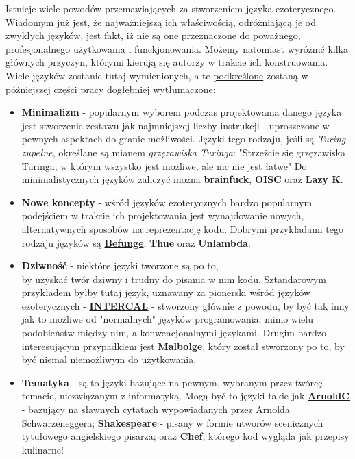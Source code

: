 \documentclass[fleqn,10pt]{SelfArx} %
\begin{document}
Istnieje wiele powodów przemawiających za stworzeniem języka ezoterycznego.
Wiadomym już jest, że najważniejszą ich właściwością, odróżniającą je od zwykłych języków,
jest fakt, iż nie są one przeznaczone do poważnego, profesjonalnego użytkowania i funckjonowania.
Możemy natomiast wyróżnić kilka głównych przyczyn, którymi kierują się autorzy w trakcie ich konstruowania.
Wiele języków zostanie tutaj wymienionych, a te \underline{podkreślone} zostaną w późniejszej części pracy dogłębniej wytłumaczone:
\begin{itemize}
	\item \textbf{Minimalizm} - popularnym wyborem podczas projektowania danego języka jest stworzenie zestawu jak najmniejszej liczby instrukcji - 
	uproszczone w pewnych aspektach do granic możliwości.
	Języki tego rodzaju, jeśli są \textit{Turing-zupełne}, określane są mianem \textit{grzęzawiska Turinga}:
	"Strzeżcie się grzęzawiska Turinga, w którym wszystko jest możliwe, ale nic nie jest łatwe"\cite{perlisAlan:epigrams}
	Do minimalistycznych języków zaliczyć można \underline{\textbf{brainfuck}}, \textbf{OISC} oraz \textbf{Lazy K}.
	\item \textbf{Nowe koncepty} - wśród języków ezoterycznych bardzo popularnym podejściem w trakcie ich projektowania jest 
	wynajdowanie nowych, alternatywnych sposobów na reprezentację kodu. Dobrymi przykładami tego rodzaju języków są \underline{\textbf{Befunge}}, \textbf{Thue} oraz \textbf{Unlambda}.
	\item \textbf{Dziwność} - niektóre języki tworzone są po to,\\by uzyskać twór dziwny i trudny do pisania w nim kodu.
	Sztandarowym przykładem byłby tutaj język, uznawany za pionerski wśród języków ezoterycznych - \hyperlink{oldestLang}{\underline{\textbf{INTERCAL}}} - stworzony głównie z powodu,
	by być tak inny jak to możliwe od "normalnych" języków programowania, mimo wielu podobieństw między nim, a konwencjonalnymi językami.
	Drugim bardzo interesującym przypadkiem jest \underline{\textbf{Malbolge}}, który został stworzony po to, by być niemal niemożliwym do użytkowania.
	\item \textbf{Tematyka} - są to języki bazujące na pewnym, wybranym przez twórcę temacie, niezwiązanym z informatyką.
	Mogą być to języki takie jak \underline{\textbf{ArnoldC}} - bazujący na sławnych cytatach wypowiadanych przez Arnolda Schwarzeneggera; \textbf{Shakespeare} - pisany w formie utworów scenicznych tytułowego angielskiego pisarza;
	oraz \underline{\textbf{Chef}}, którego kod wygląda jak przepisy kulinarne!

\end{itemize}
\end{document}

